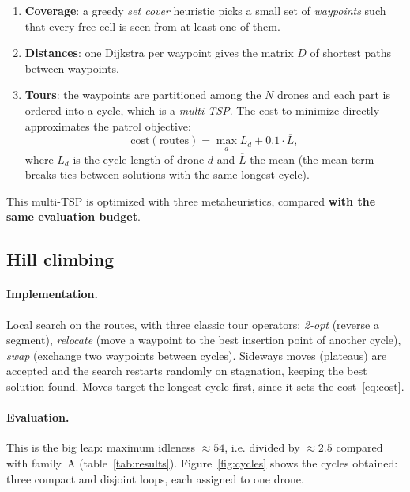 \documentclass[11pt,a4paper]{article}
\begin{document}
\begin{enumerate}
  \item \textbf{Coverage}: a greedy \emph{set cover} heuristic picks a small set
  of \emph{waypoints} such that every free cell is seen from at least one of
  them.
  \item \textbf{Distances}: one Dijkstra per waypoint gives the matrix $D$ of
  shortest paths between waypoints.
  \item \textbf{Tours}: the waypoints are partitioned among the $N$ drones and
  each part is ordered into a cycle, which is a \emph{multi-TSP}. The cost to
  minimize directly approximates the patrol objective:
  \begin{equation}
    \text{cost}(\text{routes}) = \max_d L_d + 0.1\cdot\overline{L},
    \label{eq:cost}
  \end{equation}
  where $L_d$ is the cycle length of drone $d$ and $\overline{L}$ the mean (the
  mean term breaks ties between solutions with the same longest cycle).
\end{enumerate}

This multi-TSP is optimized with three metaheuristics, compared \textbf{with the
same evaluation budget}.

\subsection{Hill climbing}

\paragraph{Implementation.} Local search on the routes, with three classic tour
operators: \emph{2-opt} (reverse a segment), \emph{relocate} (move a waypoint to
the best insertion point of another cycle), \emph{swap} (exchange two waypoints
between cycles). Sideways moves (plateaus) are accepted and the search restarts
randomly on stagnation, keeping the best solution found. Moves target the
longest cycle first, since it sets the cost~\eqref{eq:cost}.

\paragraph{Evaluation.} This is the big leap: maximum idleness $\approx 54$,
i.e. divided by $\approx 2.5$ compared with family~A (table~\ref{tab:results}).
Figure~\ref{fig:cycles} shows the cycles obtained: three compact and disjoint
loops, each assigned to one drone.
\end{document}
